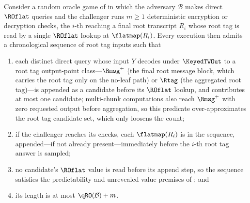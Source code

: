 \begin{lemma}
\label{lem:root-candidate-seq}
Consider a random oracle game of  in which the
adversary $\mathcal{B}$ makes direct $\ROflat$ queries and the challenger
runs $m \geq 1$ deterministic
encryption or decryption checks, the $i$-th reaching a final root transcript $R_i$
whose root tag is read by a single $\ROflat$ lookup at $\flatmap(R_i)$.
Every execution then admits a chronological sequence of root tag inputs
such that
\begin{enumerate}
\item each distinct direct query whose input $Y$ decodes under
  $\KeyedTWOut$ to a root tag output-point class---$\Rmsg^+$ (the final
  root message block, which carries the root tag only on the no-leaf path)
  or $\Rtag$ (the aggregated root tag)---is appended as a candidate before
  its $\ROflat$ lookup, and contributes at most one candidate; multi-chunk
  computations also reach $\Rmsg^+$ with zero requested output before
  aggregation, so this predicate over-approximates the root tag candidate
  set, which only loosens the count;
\item if the challenger reaches its checks, each $\flatmap(R_i)$ is in
  the sequence, appended---if not already present---immediately before
  the $i$-th root tag answer is sampled;
\item no candidate's $\ROflat$ value is read before its append step, so
  the sequence satisfies the predictability and unrevealed-value premises
  of ;
  and
\item its length is at most $\qRO(\mathcal{B}) + m$.
\end{enumerate}
\end{lemma}

